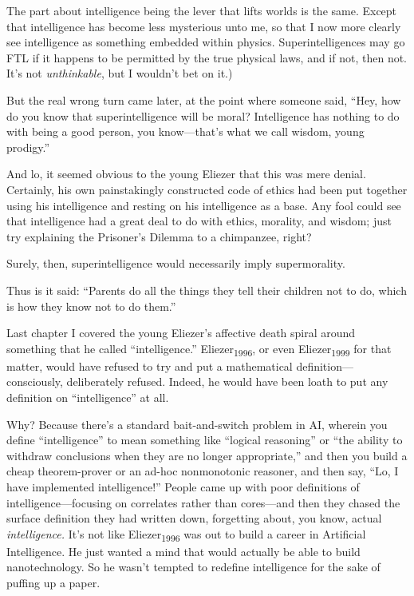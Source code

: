 {
 The part about intelligence being the lever that lifts worlds is
the same. Except that intelligence has become less mysterious unto me,
so that I now more clearly see intelligence as something embedded
within physics. Superintelligences may go FTL if it happens to be
permitted by the true physical laws, and if not, then not.
It's not \textit{unthinkable}, but I
wouldn't bet on it.)}

{
 But the real wrong turn came later, at the point where someone
said, ``Hey, how do you know that superintelligence
will be moral? Intelligence has nothing to do with being a good person,
you know---that's what we call wisdom, young
prodigy.''}

{
 And lo, it seemed obvious to the young Eliezer that this was mere
denial. Certainly, his own painstakingly constructed code of ethics had
been put together using his intelligence and resting on his
intelligence as a base. Any fool could see that intelligence had a
great deal to do with ethics, morality, and wisdom; just try explaining
the Prisoner's Dilemma to a chimpanzee, right?}

{
 Surely, then, superintelligence would necessarily imply
supermorality.}

{
 Thus is it said: ``Parents do all the things they
tell their children not to do, which is how they know not to do
them.''}

\myendsectiontext


{
 Last chapter I covered the young Eliezer's
affective death spiral around something that he called
``intelligence.''
Eliezer\textsubscript{1996}, or even Eliezer\textsubscript{1999} for
that matter, would have refused to try and put a mathematical
definition---consciously, deliberately refused. Indeed, he would have
been loath to put any definition on
``intelligence'' at all. }

{
 Why? Because there's a standard bait-and-switch
problem in AI, wherein you define
``intelligence'' to mean something
like ``logical reasoning'' or
``the ability to withdraw conclusions when they are no
longer appropriate,'' and then you build a cheap
theorem-prover or an ad-hoc nonmonotonic reasoner, and then say,
``Lo, I have implemented
intelligence!'' People came up with poor definitions
of intelligence---focusing on correlates rather than cores---and then
they chased the surface definition they had written down, forgetting
about, you know, actual \textit{intelligence.} It's not
like Eliezer\textsubscript{1996} was out to build a career in
Artificial Intelligence. He just wanted a mind that would actually be
able to build nanotechnology. So he wasn't tempted to
redefine intelligence for the sake of puffing up a paper.}

